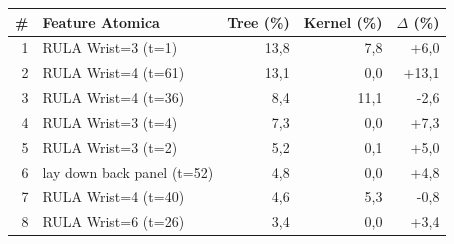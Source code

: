 \begin{tabular*}{\linewidth}{@{}r@{\extracolsep{\fill}}lrrr@{}}
\toprule
\textbf{\#} & \textbf{Feature Atomica} & \textbf{Tree (\%)} & \textbf{Kernel (\%)} & \textbf{$\Delta$ (\%)} \\
\midrule
1 & RULA Wrist=3 (t=1) & 13{,}8 & 7{,}8 & +6{,}0 \\
2 & RULA Wrist=4 (t=61) & 13{,}1 & 0{,}0 & +13{,}1 \\
3 & RULA Wrist=4 (t=36) & 8{,}4 & 11{,}1 & -2{,}6 \\
4 & RULA Wrist=3 (t=4) & 7{,}3 & 0{,}0 & +7{,}3 \\
5 & RULA Wrist=3 (t=2) & 5{,}2 & 0{,}1 & +5{,}0 \\
6 & lay down back panel (t=52) & 4{,}8 & 0{,}0 & +4{,}8 \\
7 & RULA Wrist=4 (t=40) & 4{,}6 & 5{,}3 & -0{,}8 \\
8 & RULA Wrist=6 (t=26) & 3{,}4 & 0{,}0 & +3{,}4 \\
\bottomrule
\end{tabular*}
